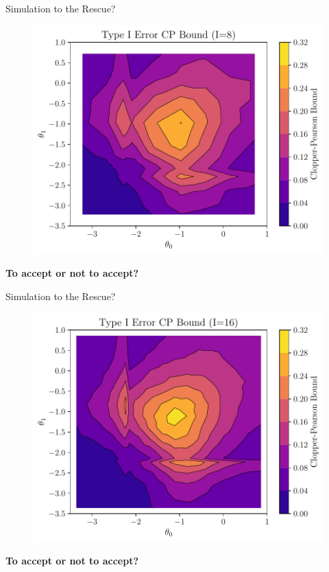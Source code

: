 \begin{frame}{Simulation to the Rescue?}
\begin{figure}
    \centering
    \includegraphics[width=0.9\linewidth]{figs/introduction_rescue_2.pdf}
\end{figure}
\begin{center}
    \textbf{To accept or not to accept?}
\end{center}
\end{frame}

\begin{frame}{Simulation to the Rescue?}
\begin{figure}
    \centering
    \includegraphics[width=0.9\linewidth]{figs/introduction_rescue_3.pdf}
\end{figure}
\begin{center}
    \textbf{To accept or not to accept?}
\end{center}
\end{frame}

